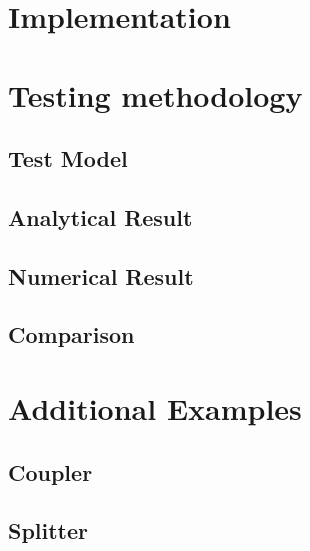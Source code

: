 \section{Implementation}
\section{Testing methodology}
\subsection{Test Model}
\subsection{Analytical Result}
\subsection{Numerical Result}
\subsection{Comparison}
\section{Additional Examples}
\subsection{Coupler}
\subsection{Splitter}

